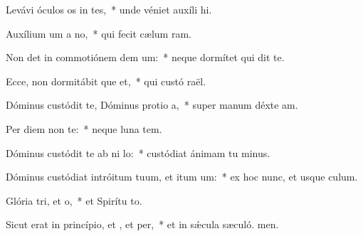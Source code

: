\item Levávi óculos os in tes,~* unde véniet auxíli hi.
\item Auxílium um a no,~* qui fecit cælum  ram.
\item Non det in commotiónem dem um:~* neque dormítet qui dit te.
\item Ecce, non dormitábit que et,~* qui custó raël.
\item Dóminus custódit te, Dóminus protio a,~* super manum déxte am.
\item Per diem  non  te:~* neque luna  tem.
\item Dóminus custódit te ab ni lo:~* custódiat ánimam tu minus.
\item Dóminus custódiat intróitum tuum, et itum um:~* ex hoc nunc, et usque  culum.
\item Glória tri, et o,~* et Spirítu to.
\item Sicut erat in princípio, et , et per,~* et in sǽcula sæculó. men.

